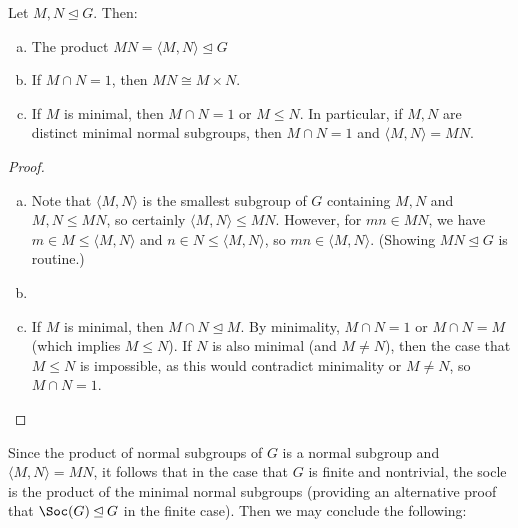 \begin{lemma}\label{lem:minimal_normal_subgroups}
    Let $M,N \unlhd G$. Then:
    \begin{enumerate}[(a)]
        \item The product $MN = \langle M,N \rangle \unlhd G$
        \item If $M \cap N = 1$, then $MN \cong M \times N$.
        \item If $M$ is minimal, then $M \cap N = 1$ or $M \leq N$. In particular, if $M,N$ are distinct minimal normal subgroups, then $M \cap N = 1$ and $\langle M,N \rangle = MN$.
    \end{enumerate}
\end{lemma}

\begin{proof}
    \begin{enumerate}[(a)]
        \item Note that $\langle M,N \rangle$ is the smallest subgroup of $G$ containing $M,N$ and $M,N \leq MN$, so certainly $\langle M,N \rangle \leq MN$. However, for $mn \in MN$, we have $m \in M \leq \langle M,N \rangle$ and $n \in N \leq \langle M,N \rangle$, so $mn \in \langle M,N \rangle$. (Showing $MN \unlhd G$ is routine.)
        \item {}
        \item If $M$ is minimal, then $M \cap N \unlhd M$. By minimality, $M \cap N = 1$ or $M \cap N = M$ (which implies $M \leq N$). If $N$ is also minimal (and $M \neq N$), then the case that $M \leq N$ is impossible, as this would contradict minimality or $M \neq N$, so $M \cap N = 1$.
    \end{enumerate}
\end{proof}

Since the product of normal subgroups of $G$ is a normal subgroup and $\langle M,N \rangle = MN$, it follows that in the case that $G$ is finite and nontrivial, the socle is the product of the minimal normal subgroups (providing an alternative proof that $\Soc(G) \unlhd G$ in the finite case). Then we may conclude the following:

\begin{proposition}\label{prop:socle_is_product_of_minimal_normal_subgroups}
\end{proposition}

